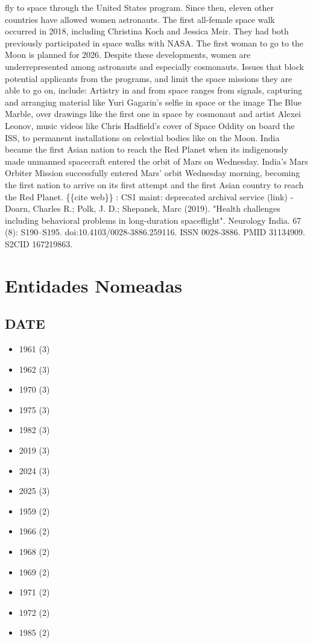 \documentclass[12pt]{article}
\begin{document}
fly to space through the United States program. Since then, eleven other countries have allowed women astronauts. The first all-female space walk occurred in 2018, including Christina Koch and Jessica Meir. They had both previously participated in space walks with NASA. The first woman to go to the Moon is planned for 2026. Despite these developments, women are underrepresented among astronauts and especially cosmonauts. Issues that block potential applicants from the programs, and limit the space missions they are able to go on, include: Artistry in and from space ranges from signals, capturing and arranging material like Yuri Gagarin's selfie in space or the image The Blue Marble, over drawings like the first one in space by cosmonaut and artist Alexei Leonov, music videos like Chris Hadfield's cover of Space Oddity on board the ISS, to permanent installations on celestial bodies like on the Moon. India became the first Asian nation to reach the Red Planet when its indigenously made unmanned spacecraft entered the orbit of Mars on Wednesday. India's Mars Orbiter Mission successfully entered Mars' orbit Wednesday morning, becoming the first nation to arrive on its first attempt and the first Asian country to reach the Red Planet. \{\{cite web\}\} : CS1 maint: deprecated archival service (link) - Doarn, Charles R.; Polk, J. D.; Shepanek, Marc (2019). "Health challenges including behavioral problems in long-duration spaceflight". Neurology India. 67 (8): S190–S195. doi:10.4103/0028-3886.259116. ISSN 0028-3886. PMID 31134909. S2CID 167219863.

\section{Entidades Nomeadas}

\subsection*{DATE}
\begin{itemize}
\item 1961 (3)
\item 1962 (3)
\item 1970 (3)
\item 1975 (3)
\item 1982 (3)
\item 2019 (3)
\item 2024 (3)
\item 2025 (3)
\item 1959 (2)
\item 1966 (2)
\item 1968 (2)
\item 1969 (2)
\item 1971 (2)
\item 1972 (2)
\item 1985 (2)
\end{itemize}
\end{document}
